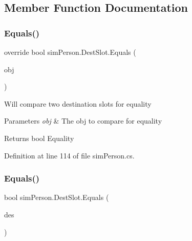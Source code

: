 \subsection{Member Function Documentation}
\hypertarget{classsim_person_1_1_dest_slot_a212d339d7ee8672bea7c06e3ce09a9a4}{}\label{classsim_person_1_1_dest_slot_a212d339d7ee8672bea7c06e3ce09a9a4} 
\subsubsection{\texorpdfstring{Equals()}{Equals()}\hspace{0.1cm}{\footnotesize\ttfamily [1/2]}}
{\footnotesize\ttfamily override bool sim\+Person.\+Dest\+Slot.\+Equals (\begin{DoxyParamCaption}\item[{object}]{obj }\end{DoxyParamCaption})}

Will compare two destination slots for equality


\begin{DoxyParams}{Parameters}
{\em obj} & The obj to compare for equality \\
\hline
\end{DoxyParams}
\begin{DoxyReturn}{Returns}
bool Equality 
\end{DoxyReturn}


Definition at line 114 of file sim\+Person.\+cs.

\hypertarget{classsim_person_1_1_dest_slot_abda5a5382912f7eaa87ae75363a9cd81}{}\label{classsim_person_1_1_dest_slot_abda5a5382912f7eaa87ae75363a9cd81} 
\subsubsection{\texorpdfstring{Equals()}{Equals()}\hspace{0.1cm}{\footnotesize\ttfamily [2/2]}}
{\footnotesize\ttfamily bool sim\+Person.\+Dest\+Slot.\+Equals (\begin{DoxyParamCaption}\item[{\hyperlink{classsim_person_1_1_dest_slot}{Dest\+Slot}}]{des }\end{DoxyParamCaption})}


